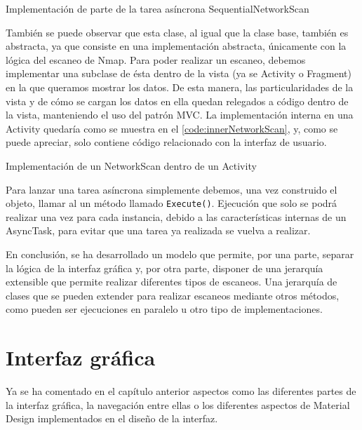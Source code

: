\begin{code}
	\caption{Implementación de parte de la tarea asíncrona SequentialNetworkScan}
	\label{code:sequentialNetworkScan}
	
\end{code}

También se puede observar que esta clase, al igual que la clase base, también es abstracta, ya que consiste en una implementación abstracta, únicamente con la lógica del escaneo de Nmap. Para poder realizar un escaneo, debemos implementar una subclase de ésta dentro de la vista (ya se Activity o Fragment) en la que queramos mostrar los datos. De esta manera, las particularidades de la vista y de cómo se cargan los datos en ella quedan relegados a código dentro de la vista, manteniendo el uso del patrón MVC. La implementación interna en una Activity quedaría como se muestra en el \ref{code:innerNetworkScan}, y, como se puede apreciar, solo contiene código relacionado con la interfaz de usuario.

\begin{code}
	\caption{Implementación de un NetworkScan dentro de un Activity}
	\label{code:innerNetworkScan}
	
\end{code}

Para lanzar una tarea asíncrona simplemente debemos, una vez construido el objeto, llamar al un método llamado \texttt{Execute()}. Ejecución que solo se podrá realizar una vez para cada instancia, debido a las características internas de un AsyncTask, para evitar que una tarea ya realizada se vuelva a realizar.

En conclusión, se ha desarrollado un modelo que permite, por una parte, separar la lógica de la interfaz gráfica y, por otra parte, disponer de una jerarquía extensible que permite realizar diferentes tipos de escaneos. Una jerarquía de clases que se pueden extender para realizar escaneos mediante otros métodos, como pueden ser ejecuciones en paralelo u otro tipo de implementaciones.


\section{Interfaz gráfica}

Ya se ha comentado en el capítulo anterior aspectos como las diferentes partes de la interfaz gráfica, la navegación entre ellas o los diferentes aspectos de Material Design implementados en el diseño de la interfaz.

